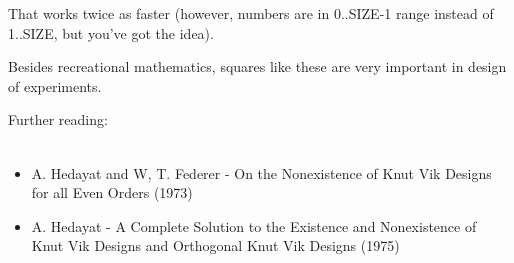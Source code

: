 That works twice as faster (however, numbers are in 0..SIZE-1 range instead of 1..SIZE, but you've got the idea).

Besides recreational mathematics, squares like these are very important in design of experiments.

Further reading:\\
\\
\begin{itemize}
\item A. Hedayat and W, T. Federer - On the Nonexistence of Knut Vik Designs for all Even Orders (1973)

\item A. Hedayat - A Complete Solution to the Existence and Nonexistence of Knut Vik Designs and Orthogonal Knut Vik Designs (1975)
\end{itemize}


